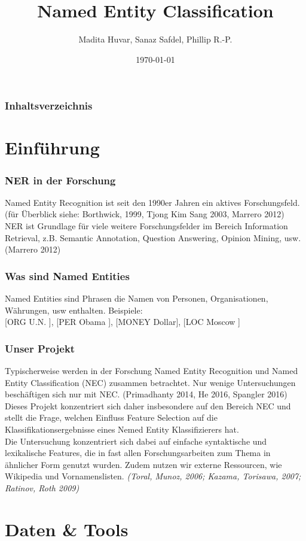 \documentclass{beamer}
\title{Named Entity Classification}
\author{Madita Huvar, Sanaz Safdel, Phillip R.-P.}
\date{\today}
\begin{document}
\begin{frame}
\titlepage
\end{frame} 

\begin{frame}
\frametitle{Inhaltsverzeichnis}
\tableofcontents
\end{frame} 


\section{Einführung}
\begin{frame}
	\frametitle{NER in der Forschung}
	Named Entity Recognition ist seit den 1990er Jahren ein aktives Forschungsfeld. (für Überblick siehe: Borthwick, 1999, Tjong Kim Sang 2003, Marrero 2012)\\
	
	NER ist Grundlage für viele weitere Forschungsfelder im Bereich Information Retrieval, z.B. Semantic Annotation, Question Answering, Opinion Mining, usw. (Marrero 2012)
\end{frame}
\begin{frame}
	\frametitle{Was sind Named Entities}
	Named Entities sind Phrasen die Namen von Personen, Organisationen, Währungen, usw enthalten. Beispiele:\\
	
	[ORG U.N. ], [PER Obama ], [MONEY Dollar], [LOC Moscow ] 
\end{frame}
	\begin{frame}
		\frametitle{Unser Projekt}
		Typischerweise werden in der Forschung Named Entity Recognition und Named Entity Classification (NEC) zusammen betrachtet. Nur wenige Untersuchungen beschäftigen sich nur mit NEC. (Primadhanty 2014, He 2016, Spangler 2016)\\
		
		Dieses Projekt konzentriert sich daher insbesondere auf den Bereich NEC und stellt die Frage, welchen Einfluss Feature Selection auf die Klassifikationsergebnisse eines Nemed Entity Klassifizierers hat.\\
		
		Die Untersuchung konzentriert sich dabei auf einfache syntaktische und lexikalische Features, die in fast allen Forschungsarbeiten zum Thema in ähnlicher Form genutzt wurden. Zudem nutzen wir externe Ressourcen, wie Wikipedia und Vornamenslisten. \textit{(Toral, Munoz, 2006; Kazama, Torisawa, 2007; Ratinov, Roth 2009)} 
	\end{frame}
\section{Daten \& Tools}
\end{document}
